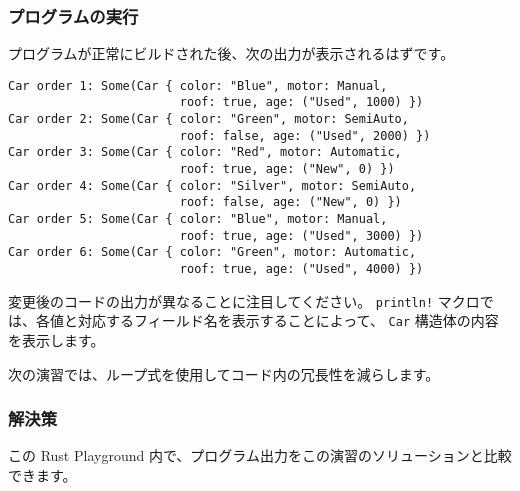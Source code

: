 \subsubsection{プログラムの実行}

プログラムが正常にビルドされた後、次の出力が表示されるはずです。

\begin{lstlisting}[numbers=none]
Car order 1: Some(Car { color: "Blue", motor: Manual,
                        roof: true, age: ("Used", 1000) })
Car order 2: Some(Car { color: "Green", motor: SemiAuto,
                        roof: false, age: ("Used", 2000) })
Car order 3: Some(Car { color: "Red", motor: Automatic,
                        roof: true, age: ("New", 0) })
Car order 4: Some(Car { color: "Silver", motor: SemiAuto,
                        roof: false, age: ("New", 0) })
Car order 5: Some(Car { color: "Blue", motor: Manual,
                        roof: true, age: ("Used", 3000) })
Car order 6: Some(Car { color: "Green", motor: Automatic,
                        roof: true, age: ("Used", 4000) })
\end{lstlisting}

変更後のコードの出力が異なることに注目してください。 \texttt{println!} マクロでは、各値と対応するフィールド名を表示することによって、 \texttt{Car} 構造体の内容を表示します。

次の演習では、ループ式を使用してコード内の冗長性を減らします。

\subsubsection{解決策}

この Rust Playground 内で、プログラム出力をこの演習のソリューションと比較できます。

